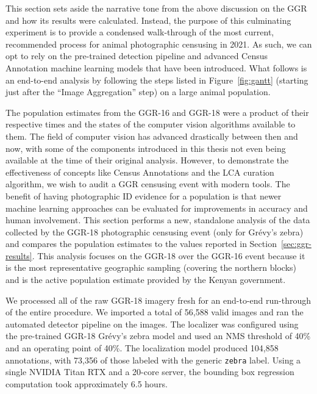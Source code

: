 This section sets aside the narrative tone from the above discussion on the GGR and how its results were calculated. Instead, the purpose of this culminating experiment is to provide a condensed walk-through of the most current, recommended process for animal photographic censusing in 2021.  As such, we can opt to rely on the pre-trained detection pipeline and advanced Census Annotation machine learning models that have been introduced.  What follows is an end-to-end analysis by following the steps listed in Figure~\ref{fig:gantt} (starting just after the ``Image Aggregation'' step) on a large animal population.

The population estimates from the GGR-16 and GGR-18 were a product of their respective times and the states of the computer vision algorithms available to them.  The field of computer vision has advanced drastically between then and now, with some of the components introduced in this thesis not even being available at the time of their original analysis.  However, to demonstrate the effectiveness of concepts like Census Annotations and the LCA curation algorithm, we wish to audit a GGR censusing event with modern tools.  The benefit of having photographic ID evidence for a population is that newer machine learning approaches can be evaluated for improvements in accuracy and human involvement.  This section performs a new, standalone analysis of the data collected by the GGR-18 photographic censusing event (only for Gr\'evy's zebra) and compares the population estimates to the values reported in Section~\ref{sec:ggr-results}.  This analysis focuses on the GGR-18 over the GGR-16 event because it is the most representative geographic sampling (covering the northern blocks) and is the active population estimate provided by the Kenyan government.

We processed all of the raw GGR-18 imagery fresh for an end-to-end run-through of the entire procedure.  We imported a total of 56,588 valid images and ran the automated detector pipeline on the images.  The localizer was configured using the pre-trained GGR-18 Gr\'evy's zebra model and used an NMS threshold of 40\% and an operating point of 40\%.  The localization model produced 104,858 annotations, with 73,356 of those labeled with the generic \texttt{zebra} label.  Using a single NVIDIA Titan RTX and a 20-core server, the bounding box regression computation took approximately 6.5 hours.

